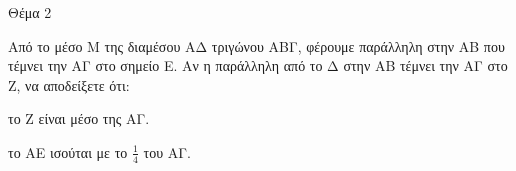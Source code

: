 
Θέμα 2

Από το μέσο Μ της διαμέσου ΑΔ τριγώνου ΑΒΓ, φέρουμε παράλληλη στην ΑΒ που τέμνει την ΑΓ στο σημείο Ε. Αν η παράλληλη από το Δ στην ΑΒ τέμνει την ΑΓ στο Ζ, να αποδείξετε ότι:

\begin{alist}
\item το Ζ είναι μέσο της ΑΓ. 

\item το ΑΕ ισούται με το $\frac{1}{4}$ του ΑΓ. 
\end{alist}
